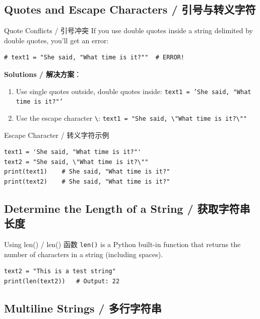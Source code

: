 \documentclass[11pt,a4paper]{article}
\begin{document}
\subsection{Quotes and Escape Characters / 引号与转义字符}

\begin{warning}{Quote Conflicts / 引号冲突}
    If you use double quotes inside a string delimited by double quotes, you'll get an error:
    \begin{lstlisting}
# text1 = "She said, "What time is it?""  # ERROR!
    \end{lstlisting}
    \textbf{Solutions / 解决方案}：
    \begin{enumerate}
        \item Use single quotes outside, double quotes inside:
        \texttt{text1 = 'She said, "What time is it?"'}
        \item Use the escape character \texttt{\textbackslash}:
        \texttt{text1 = "She said, \textbackslash"What time is it?\textbackslash""}
    \end{enumerate}
\end{warning}

\begin{examplebox}{Escape Character / 转义字符示例}
\begin{lstlisting}
text1 = 'She said, "What time is it?"'
text2 = "She said, \"What time is it?\""
print(text1)    # She said, "What time is it?"
print(text2)    # She said, "What time is it?"
\end{lstlisting}
\end{examplebox}

\subsection{Determine the Length of a String / 获取字符串长度}

\begin{examplebox}{Using len() / len() 函数}
    \texttt{len()} is a Python built-in function that returns the number of characters in a string (including spaces).
\begin{lstlisting}
text2 = "This is a test string"
print(len(text2))   # Output: 22
\end{lstlisting}
\end{examplebox}

\subsection{Multiline Strings / 多行字符串}
\end{document}
